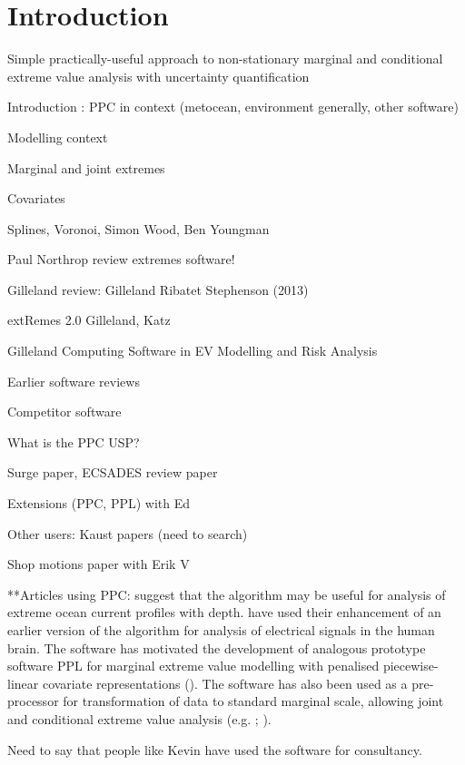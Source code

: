 \documentclass[a4paper,fleqn]{cas-sc} %
\begin{document}
\section{Introduction}

\par Simple practically-useful approach to non-stationary marginal and conditional extreme value analysis with uncertainty quantification
\par  Introduction : PPC in context (metocean, environment generally, other software)
\par  Modelling context
\par  Marginal and joint extremes
\par  Covariates
\par  Splines, Voronoi, Simon Wood, Ben Youngman
\par  Paul Northrop review extremes software!
\par Gilleland review: Gilleland Ribatet Stephenson (2013)
\par extRemes 2.0 Gilleland, Katz 
\par Gilleland Computing Software in EV Modelling and Risk Analysis
\par  Earlier software reviews
\par  Competitor software
\par  What is the PPC USP?
\par  Surge paper, ECSADES review paper
\par  Extensions (PPC, PPL) with Ed
\par  Other users: Kaust papers (need to search)
\par Shop motions paper with Erik V

\par ***Articles using PPC: \cite{BorEA19} suggest that the algorithm may be useful for analysis of extreme ocean current profiles with depth. \cite{GurEA21} have used their enhancement of an earlier version of the algorithm for analysis of electrical signals in the human brain. The software has motivated the development of analogous prototype software PPL for marginal extreme value modelling with penalised piecewise-linear covariate representations (\citealt{BrlEA22}). The software has also been used as a pre-processor for transformation of data to standard marginal scale, allowing joint and conditional extreme value analysis (e.g. \citealt{ShtEA20a}; \citealt{ShtEA21}).

\par Need to say that people like Kevin have used the software for consultancy.
\end{document}
